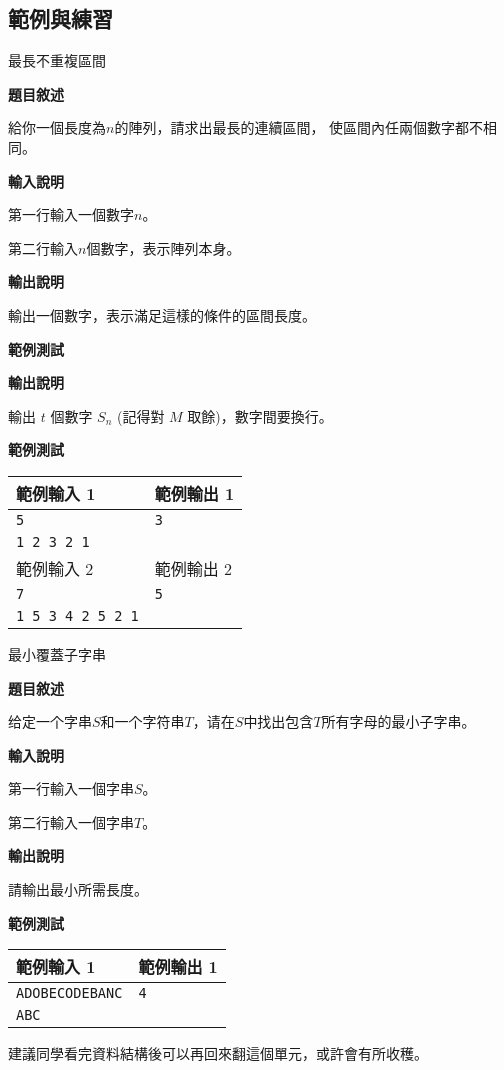     \subsection{範例與練習}

    \problem 最長不重複區間

    \textbf{題目敘述}

    給你一個長度為$n$的陣列，請求出最長的連續區間，
    使區間內任兩個數字都不相同。

    \textbf{輸入說明}

    第一行輸入一個數字$n$。

    第二行輸入$n$個數字，表示陣列本身。

    \textbf{輸出說明}

    輸出一個數字，表示滿足這樣的條件的區間長度。

    \textbf{範例測試}

    \textbf{輸出說明}

    輸出 $t$ 個數字 $S_n$ (記得對 $M$ 取餘)，數字間要換行。

    \textbf{範例測試}

    \begin{tabular}{|m{7cm}|m{7cm}|}
        \hline
        範例輸入 1 & 範例輸出 1 \\
        \hline
        \verb|5| &  \verb|3| \\
        \verb|1 2 3 2 1| & \\
        \hline
        範例輸入 2 & 範例輸出 2 \\
        \hline
        \verb|7| &  \verb|5| \\
        \verb|1 5 3 4 2 5 2 1| & \\
        \hline
    \end{tabular}

    \problem 最小覆蓋子字串

    \textbf{題目敘述}

    给定一个字串$S$和一个字符串$T$，请在$S$中找出包含$T$所有字母的最小子字串。

    \textbf{輸入說明}

    第一行輸入一個字串$S$。

    第二行輸入一個字串$T$。

    \textbf{輸出說明}

    請輸出最小所需長度。

    \textbf{範例測試}

    \begin{tabular}{|m{7cm}|m{7cm}|}
        \hline
        範例輸入 1 & 範例輸出 1 \\
        \hline
        \verb|ADOBECODEBANC| &  \verb|4| \\
        \verb|ABC| & \\
        \hline
    \end{tabular}

    \begin{tip}
        建議同學看完資料結構後可以再回來翻這個單元，或許會有所收穫。
    \end{tip}